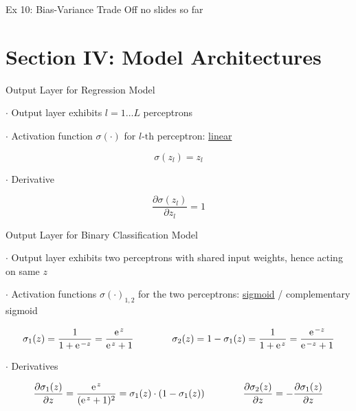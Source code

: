 \documentclass[mathserif, aspectratio=1610]{intbeamer}
\begin{document}
\begin{frame}[t]{Ex 10: Bias-Variance Trade Off}
no slides so far
\end{frame}


\section{Section IV: Model Architectures}
\begin{frame}[t]{Output Layer for Regression Model}

$\cdot$ Output layer exhibits $l=1 \dots L$ perceptrons

$\cdot$ Activation function $\sigma(\cdot)$ for $l\text{-th}$ perceptron: \underline{linear}

$$\sigma(z_l) = z_l$$

$\cdot$ Derivative

$$\frac{\partial \sigma(z_l)}{\partial z_l} = 1$$

\end{frame}



\begin{frame}[t]{Output Layer for Binary Classification Model}

$\cdot$ Output layer exhibits two perceptrons with shared input weights, hence acting on same $z$

$\cdot$ Activation functions $\sigma(\cdot)_{1,2}$ for the two perceptrons: \underline{sigmoid} / complementary sigmoid

$$\sigma_1(z) = \frac{1}{1+\e^{-z}} = \frac{\e^{z}}{\e^{z}+1} \qquad\qquad \sigma_2(z) = 1-\sigma_1(z) = \frac{1}{1 + \e^{z}} = \frac{\e^{-z}}{\e^{-z}+1}$$

\begin{center}
\end{center}

$\cdot$ Derivatives

$$\frac{\partial \sigma_1(z)}{\partial z} = \frac{\e^{z}}{(\e^{z}+1)^2} = \sigma_1(z) \cdot (1-\sigma_1(z)) \qquad\qquad \frac{\partial \sigma_2(z)}{\partial z} = - \frac{\partial \sigma_1(z)}{\partial z} $$

\end{frame}
\end{document}
